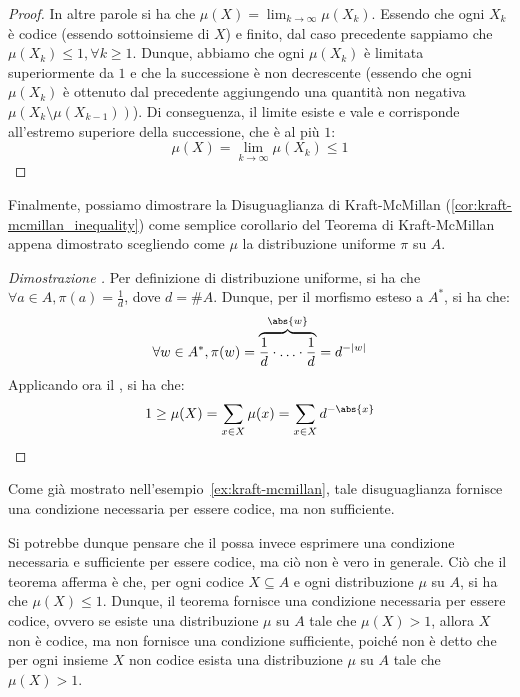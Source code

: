 \begin{proof}
  In altre parole si ha che \(\mu(X) = \lim_{k \to \infty} \mu(X_k)\). Essendo che ogni \(X_k\) è codice (essendo sottoinsieme di \(X\)) e finito, dal caso precedente sappiamo che \(\mu(X_k) \leq 1, \forall k \geq 1\).
  Dunque, abbiamo che ogni \(\mu(X_k)\) è limitata superiormente da \(1\) e che la successione è non decrescente (essendo che ogni \(\mu(X_k)\) è ottenuto dal precedente aggiungendo una quantità non negativa \(\mu(X_{k}\setminus\mu(X_{k-1}))\)). 
  Di conseguenza, il limite esiste e vale e corrisponde all'estremo superiore della successione, che è al più \(1\):
  \[\mu(X) = \lim_{k \to \infty} \mu(X_k) \leq 1\]
\end{proof}

Finalmente, possiamo dimostrare la Disuguaglianza di Kraft-McMillan (\ref{cor:kraft-mcmillan_inequality}) come semplice corollario del Teorema di Kraft-McMillan appena dimostrato scegliendo come \(\mu\) la distribuzione uniforme \(\pi\) su \(A\).

\begin{proof}[Dimostrazione ]
  Per definizione di distribuzione uniforme, si ha che \(\forall a \in A, \pi(a) = \frac{1}{d}\), dove \(d = \# A\).
  Dunque, per il morfismo esteso a \(A^*\), si ha che:
  \begin{equation*}
    \forall w \in A^*, \pi(w) = \overbrace{\frac{1}{d}\cdot\ldots\cdot\frac{1}{d}}^{\abs{w}} = d^{-\lvert w\rvert}
  \end{equation*}
  Applicando ora il , si ha che:
  \[1 \geq\mu(X) = \sum_{x \in X} \mu(x) = \sum_{x \in X} d^{-\abs{x}}\]
\end{proof}

Come già mostrato nell'esempio~\ref{ex:kraft-mcmillan}, tale disuguaglianza fornisce una condizione necessaria per essere codice, ma non sufficiente.

Si potrebbe dunque pensare che il  possa invece esprimere una condizione necessaria e sufficiente per essere codice, ma ciò non è vero in generale.
Ciò che il teorema afferma è che, per ogni codice \(X \subseteq A\) e ogni distribuzione \(\mu\) su \(A\), si ha che \(\mu(X) \leq 1\).
Dunque, il teorema fornisce una condizione necessaria per essere codice, ovvero se esiste una distribuzione \(\mu\) su \(A\) tale che \(\mu(X) > 1\), allora \(X\) non è codice, ma non fornisce una condizione sufficiente, poiché non è detto che per ogni insieme \(X\) non codice esista una distribuzione \(\mu\) su \(A\) tale che \(\mu(X) > 1\).

